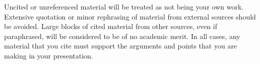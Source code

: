 \documentclass{csse4400}
\begin{document}
Uncited or unreferenced material will be treated as not being your own work.
Extensive quotation or minor rephrasing of material from external sources should be avoided.
Large blocks of cited material from other sources, even if paraphrased, will be considered to be of no academic merit.
In all cases, any material that you cite must support the arguments and points that you are making in your presentation.


%
%
\end{document}
